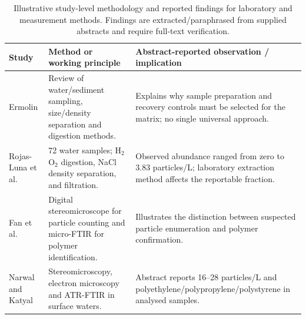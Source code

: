 \documentclass[10pt,a4paper]{article}
\begin{document}
\begin{table}[H]\centering\scriptsize
\caption{Illustrative study-level methodology and reported findings for laboratory and measurement methods. Findings are extracted/paraphrased from supplied abstracts and require full-text verification.}
\begin{tabularx}{\linewidth}{@{}p{2.8cm}XX@{}}\toprule Study & Method or working principle & Abstract-reported observation / implication \\ \midrule
Ermolin \cite{MPWE00061} & Review of water/sediment sampling, size/density separation and digestion methods. & Explains why sample preparation and recovery controls must be selected for the matrix; no single universal approach. \\[2pt]
Rojas-Luna et al. \cite{MPWE00090} & 72 water samples; H$_2$O$_2$ digestion, NaCl density separation, and filtration. & Observed abundance ranged from zero to 3.83 particles/L; laboratory extraction method affects the reportable fraction. \\[2pt]
Fan et al. \cite{MPWE00013} & Digital stereomicroscope for particle counting and micro-FTIR for polymer identification. & Illustrates the distinction between suspected particle enumeration and polymer confirmation. \\[2pt]
Narwal and Katyal \cite{MPWE00012} & Stereomicroscopy, electron microscopy and ATR-FTIR in surface waters. & Abstract reports 16--28 particles/L and polyethylene/polypropylene/polystyrene in analysed samples. \\[2pt]
\bottomrule\end{tabularx}\end{table}
\clearpage
\end{document}
